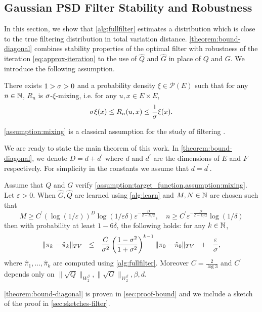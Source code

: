 \subsection{Gaussian PSD Filter Stability and Robustness}\label{sec:theory}
In this section, we show that \cref{alg:fullfilter} estimates a distribution which is close to the true filtering distribution in total variation distance. \cref{theorem:bound-diagonal} combines stability properties of the optimal filter with robustness of the iteration \cref{eq:approx-iteration} to the use of $\hat Q$ and $\hat G$ in place of $Q$ and $G$. We introduce the following assumption.

\begin{assumption}[$R_n$ is mixing]\label{assumption:mixing}
    There exists $1 >\sigma > 0$ and a probability density $\xi\in\mathcal P(E)$ such that for any $n \in\mathbb N$, $R_n$ is $\sigma$-$\xi$-mixing, i.e. for any $u, x \in E \times E$,
    \begin{align}
        \sigma \xi(x) \leq R_n(u, x) \leq \frac{1}{\sigma}\xi(x).
    \end{align}
\end{assumption}
\cref{assumption:mixing} is a classical assumption for the study of filtering \citep{cappehmm}.

We are ready to state the main theorem of this work. In \cref{theorem:bound-diagonal}, we denote $D = d + d^\prime$ where $d$ and $d^\prime$ are the dimensions of $E$ and $F$ respectively. For simplicity in the constants we assume that $d = d^\prime$.

\begin{theorem}\label{theorem:bound-diagonal}
Assume that $Q$ and $G$ verify \cref{assumption:target_function,assumption:mixing}. Let $\varepsilon > 0$.
When $\hat{G}, \hat{Q}$ are learned using \cref{alg:learn} and $M, N \in \mathbb N$ are chosen such that
%
$$M \geq C^\prime(\log\left(1/\varepsilon\right))^D\log\left(1/\varepsilon\delta\right)\varepsilon^{-\frac{D}{\beta - D/2}}, \quad n \geq C^\prime \varepsilon^{-\frac{D}{\beta - D/2}}\log (1/\delta)$$
%
then with probability at least $1-6\delta$, the following holds: for any $k \in \mathbb N$,
\begin{align}
    \Vert \pi_k - \hat\pi_k\Vert_{TV} ~~\leq~~ \frac{C}{\sigma^2}\left(\frac{1-\sigma^2}{1 + \sigma^2}\right)^{k-1}\|\pi_0 - \hat{\pi}_0\|_{TV} ~~+~~ \frac{\varepsilon}{\sigma},
\end{align}
where $\hat{\pi}_1,\dots, \hat{\pi}_k$ are computed using \cref{alg:fullfilter}. Moreover $C=\frac{2}{\log 3}$ and $C^\prime$ depends only on $\|\sqrt{Q}\|_{W^\beta_2}, \|\sqrt{G}\|_{W^\beta_2}, \beta, d$.
\end{theorem}
\cref{theorem:bound-diagonal} is proven in \cref{sec:proof-bound} and we include a sketch of the proof in \cref{sec:sketches-filter}.

